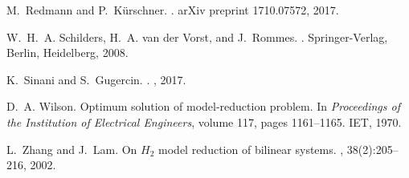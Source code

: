 \documentclass[a4paper,11pt, twoside]{article}
\begin{document}
\begin{thebibliography}{10}
M.~Redmann and P.~K\"urschner.
.
\newblock arXiv preprint 1710.07572, 2017.

W.~H.~A. Schilders, H.~A. {van der Vorst}, and J.~Rommes.
.
\newblock Springer-Verlag, Berlin, Heidelberg, 2008.

K.~Sinani and S.~Gugercin.
.
, 2017.

D.~A. Wilson.
\newblock Optimum solution of model-reduction problem.
\newblock In {\em Proceedings of the Institution of Electrical Engineers},
  volume 117, pages 1161--1165. IET, 1970.

L.~Zhang and J.~Lam.
\newblock On {$H_2$} model reduction of bilinear systems.
, 38(2):205--216, 2002.

\end{thebibliography}
\end{document}
